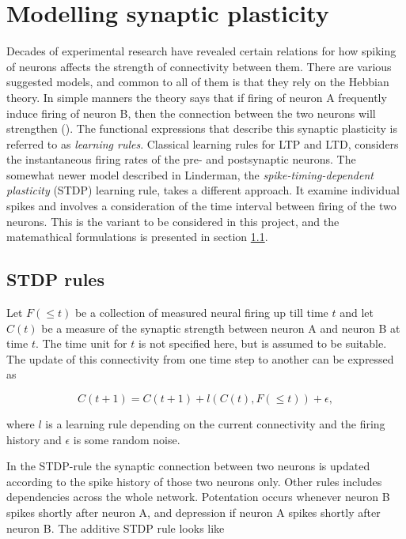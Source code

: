 \section{Modelling synaptic plasticity}
\label{sec:SP}

Decades of experimental research have revealed certain relations for how spiking of neurons affects the strength of connectivity between them. There are various suggested models, and common to all of them is that they rely on the Hebbian theory. In simple manners the theory says that if firing of neuron A frequently induce firing of neuron B, then the connection between the two neurons will strengthen (\cite{Hebb}). The functional expressions that describe this synaptic plasticity is referred to as \textit{learning rules}. Classical learning rules for LTP and LTD, considers the instantaneous firing rates of the pre- and postsynaptic neurons. The somewhat newer model described in Linderman, the \textit{spike-timing-dependent plasticity} (STDP) learning rule, takes a different approach. It examine individual spikes and involves a consideration of the time interval between firing of the two neurons. This is the variant to be considered in this project, and the matemathical formulations is presented in section \ref{sec:LR}.

\subsection{STDP rules}
\label{sec:LR}

Let $F(\leq t)$ be a collection of measured neural firing up till time $t$ and let $C(t)$ be a measure of the synaptic strength between neuron A and neuron B at time $t$. The time unit for $t$ is not specified here, but is assumed to be suitable. The update of this connectivity from one time step to another can be expressed as

\begin{equation}
\label{eq:LR}
    C(t+1) = C(t+1) + l(C(t), F(\leq t)) + \epsilon,
\end{equation}

where $l$ is a learning rule depending on the current connectivity and the firing history and $\epsilon$ is some random noise. 

In the STDP-rule the synaptic connection between two neurons is updated according to the spike history of those two neurons only. Other rules includes dependencies across the whole network. Potentation occurs whenever neuron B spikes shortly after neuron A, and depression if neuron A spikes shortly after neuron B. The additive STDP rule looks like

